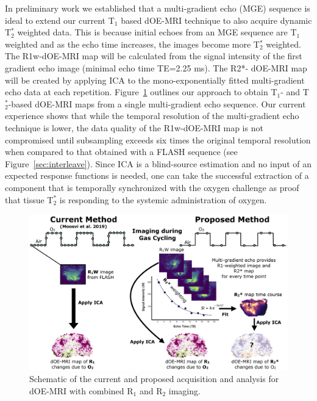 In preliminary work we established that a multi-gradient echo (\acs{MGE}) sequence is ideal to extend our current T$_1$ based dOE-MRI technique to also acquire dynamic T$_2^*$ weighted data.
This is because initial echoes from an \acs{MGE} sequence are T$_1$ weighted and as the echo time increases, the images become more T$_2^*$ weighted. 
The R1w-dOE-MRI map will be calculated from the signal intensity of the first gradient echo image (minimal echo time TE=2.25 ms). 
The R2*- dOE-MRI map will be created by applying ICA to the mono-exponentially fitted multi-gradient echo data at each repetition. 
Figure~\ref{MGE_schematic} outlines our approach to obtain T$_1$- and T$_2^*$-based \acs{dOE-MRI} maps from a single multi-gradient echo sequence. 
Our current experience shows that while the temporal resolution of the multi-gradient echo technique is lower, the data quality of the R1w-dOE-MRI map is not compromised until subsampling exceeds six times the original temporal resolution when compared to that obtained with a \acs{FLASH} sequence (see Figure~\ref{sec:interleave}).
Since ICA is a blind-source estimation and no input of an expected response functions is needed, one can take the successful extraction of a component that is temporally synchronized with the oxygen challenge as proof that tissue T$_2^*$ is responding to the systemic administration of oxygen. 

\begin{figure}[htbp]
   \centering
   \includegraphics[width=\textwidth]{futurework/futurework-images/grantfig4_MGE_schematic.png} %
   \caption{Schematic of the current and proposed acquisition and analysis for \acs{dOE-MRI} with combined R$_1$ and R$_2$ imaging.
   \label{MGE_schematic}}
\end{figure}

